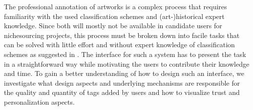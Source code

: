 The professional annotation of artworks is a complex process that requires familiarity with the used classification schemes and (art-)historical expert knowledge. 
Since both will mostly not be available in candidate users for nichesourcing projects, this process must be broken down into facile tasks that can be solved with little effort and without expert knowledge of classification schemes as suggested in \cite{He2013}.
The interface for such a system has to present the task in a straightforward way while motivating the users to contribute their knowledge and time.
To gain a better understanding of how to design such an interface, we investigate what design aspects and underlying mechanisms are responsible for the quality and quantity of tags added by users and how to visualize trust and personalization aspects.

